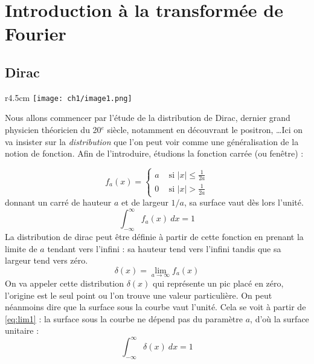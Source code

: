 \chapter{Introduction à la transformée de Fourier}
\section{Dirac}
\begin{wrapfigure}[15]{r}{4.5cm}
\vspace{-5mm}
\texttt{[image: ch1/image1.png]}
\end{wrapfigure}
Nous allons commencer par l'étude de la distribution de Dirac, dernier grand 
physicien théoricien du 20$^e$ siècle, notamment en découvrant le positron, 
\dots Ici on va insister sur la \textit{distribution} que l'on peut voir comme 
une généralisation de la notion de fonction. Afin de l'introduire, étudions la 
fonction carrée (ou fenêtre) :


\begin{equation}
f_a(x) =\left\{\begin{array}{ll}
a &\text{ si } |x| \leq \frac{1}{2a}\\
0 &\text{ si } |x| > \frac{1}{2a}
\end{array}\right.
\end{equation}
donnant un carré de hauteur $a$ et de largeur $1/a$, sa surface vaut dès lors 
l'unité. 
\begin{equation}
\int_{-\infty}^\infty f_a(x)\ dx = 1
\label{eq:lim1}
\end{equation}
La distribution de dirac peut être définie à partir de cette fonction 
en prenant la limite de $a$ tendant vers l'infini : sa hauteur tend vers 
l'infini tandis que sa largeur tend vers zéro.
\begin{equation}
\delta(x) = \lim\limits_{a\rightarrow\infty} f_a(x)
\end{equation}
On va appeler cette distribution $\delta(x)$ qui représente un pic placé en 
zéro, l'origine est le seul point ou l'on trouve une valeur particulière. On 
peut néanmoins dire que la surface sous la courbe vaut l'unité. Cela se 
voit à partir de \autoref{eq:lim1} : la surface sous la courbe ne dépend pas 
du paramètre $a$, d'où la surface unitaire :
\begin{equation}
\int_{-\infty}^\infty \delta(x)\ dx = 1
\end{equation}

